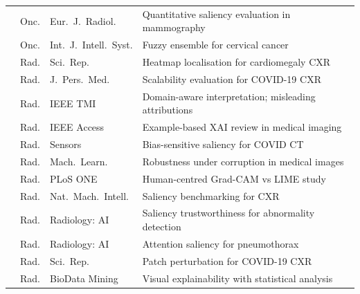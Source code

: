 \begin{table}[htbp]
\begin{tabularx}{\textwidth}{@{}p{1.6cm}p{1.2cm}p{2.8cm}X@{}}
\cite{cerekci2024quantitative} & Onc. & Eur.\ J.\ Radiol. & Quantitative saliency evaluation in mammography \\
\cite{alpsalaz2026explainability} & Onc. & Int.\ J.\ Intell.\ Syst. & Fuzzy ensemble for cervical cancer \\
\addlinespace[2pt]
\cite{Lee2021Cardiomegaly} & Rad. & Sci.\ Rep. & Heatmap localisation for cardiomegaly CXR \\
\cite{lee2020evaluation} & Rad. & J.\ Pers.\ Med. & Scalability evaluation for COVID-19 CXR \\
\cite{10051650} & Rad. & IEEE TMI & Domain-aware interpretation; misleading attributions \\
\cite{10440088} & Rad. & IEEE Access & Example-based XAI review in medical imaging \\
\cite{palatnik2021xai} & Rad. & Sensors & Bias-sensitive saliency for COVID CT \\
\cite{Repetto2025EvaluatingTR} & Rad. & Mach.\ Learn. & Robustness under corruption in medical images \\
\cite{IhongbeFouad2024} & Rad. & PLoS ONE & Human-centred Grad-CAM vs LIME study \\
\cite{saporta2022benchmarking} & Rad. & Nat.\ Mach.\ Intell. & Saliency benchmarking for CXR \\
\cite{arun2021assessing} & Rad. & Radiology: AI & Saliency trustworthiness for abnormality detection \\
\cite{wollek2023attention} & Rad. & Radiology: AI & Attention saliency for pneumothorax \\
\cite{sun2023improving} & Rad. & Sci.\ Rep. & Patch perturbation for COVID-19 CXR \\
\cite{brima2024saliency} & Rad. & BioData Mining & Visual explainability with statistical analysis \\
\bottomrule
\end{tabularx}
\end{table}


